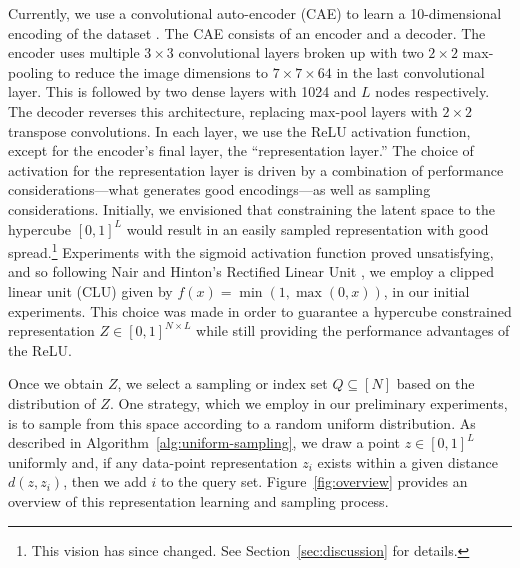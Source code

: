 \documentclass[a4paper]{article}
\begin{document}
Currently, we use a convolutional auto-encoder (CAE) to learn a 10-dimensional
encoding of the dataset \cite{krizhevsky_imagenet_2012,
  goodfellow_deep_nodate}. The CAE consists of an encoder and a decoder. The
encoder uses multiple $3\times 3$ convolutional layers broken up with two
$2\times 2$ max-pooling to reduce the image dimensions to $7\times 7 \times 64$
in the last convolutional layer. This is followed by two dense layers with 1024
and $L$ nodes respectively. The decoder reverses this architecture, replacing
max-pool layers with $2\times 2$ transpose convolutions. In each layer, we use
the ReLU activation function, except for the encoder's final layer, the
``representation layer.'' The choice of activation for the representation layer
is driven by a combination of performance considerations---what generates good
encodings---as well as sampling considerations. Initially, we envisioned that
constraining the latent space to the hypercube $[0,1]^L$ would result in an
easily sampled representation with good spread.\footnote{This vision has since
  changed. See Section~\ref{sec:discussion} for details.} Experiments with the
sigmoid activation function proved unsatisfying, and so following Nair and
Hinton's Rectified Linear Unit \cite{nair_rectified_nodate}, we employ a clipped
linear unit (CLU) given by $f(x) = \min(1, \max(0,x))$, in our initial
experiments. This choice was made in order to guarantee a hypercube constrained
representation $Z \in [0,1]^{N\times L}$ while still providing the performance
advantages of the ReLU.

Once we obtain $Z$, we select a sampling or index set $Q \subseteq [N]$ based on
the distribution of $Z$. One strategy, which we employ in our preliminary
experiments, is to sample from this space according to a random uniform
distribution. As described in Algorithm~\ref{alg:uniform-sampling}, we draw a
point $z \in [0,1]^L$ uniformly and, if any data-point representation $z_i$
exists within a given distance $d(z,z_i)$, then we add $i$ to the query
set. Figure~\ref{fig:overview} provides an overview of this representation
learning and sampling process.
\end{document}

